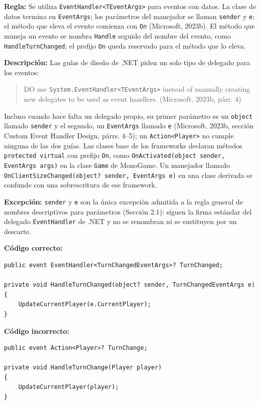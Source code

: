 \textbf{Regla:} Se utiliza \texttt{EventHandler<TEventArgs>} para eventos con datos. La clase de datos termina en \texttt{EventArgs}; los parámetros del manejador se llaman \texttt{sender} y \texttt{e}; el método que eleva el evento comienza con \texttt{On} (Microsoft, 2023b). El método que maneja un evento se nombra \texttt{Handle} seguido del nombre del evento, como \texttt{HandleTurnChanged}; el prefijo \texttt{On} queda reservado para el método que lo eleva.

\textbf{Descripción:} Las guías de diseño de .NET piden un solo tipo de delegado para los eventos:
\begin{quote}
DO use \texttt{System.EventHandler<TEventArgs>} instead of manually creating new delegates to be used as event handlers. (Microsoft, 2023b, párr. 4)
\end{quote}
\noindent Incluso cuando hace falta un delegado propio, su primer parámetro es un \texttt{object} llamado \texttt{sender} y el segundo, un \texttt{EventArgs} llamado \texttt{e} (Microsoft, 2023b, sección Custom Event Handler Design, párrs. 4--5); un \texttt{Action<Player>} no cumple ninguna de las dos guías. Las clases base de los frameworks declaran métodos \texttt{protected virtual} con prefijo \texttt{On}, como \texttt{OnActivated(object sender, EventArgs args)} en la clase \texttt{Game} de MonoGame. Un manejador llamado \texttt{OnClientSizeChanged(object? sender, EventArgs e)} en una clase derivada se confunde con una sobrescritura de ese framework.

\textbf{Excepción:} \texttt{sender} y \texttt{e} son la única excepción admitida a la regla general de nombres descriptivos para parámetros (Sección 2.1): siguen la firma estándar del delegado \texttt{EventHandler} de .NET y no se renombran ni se sustituyen por un descarte.

\textbf{Código correcto:}
\begin{lstlisting}[style=csharpstyle]
public event EventHandler<TurnChangedEventArgs>? TurnChanged;

private void HandleTurnChanged(object? sender, TurnChangedEventArgs e)
{
    UpdateCurrentPlayer(e.CurrentPlayer);
}
\end{lstlisting}

\textbf{Código incorrecto:}
\begin{lstlisting}[style=csharpstyle]
public event Action<Player>? TurnChange;

private void HandleTurnChange(Player player)
{
    UpdateCurrentPlayer(player);
}
\end{lstlisting}

